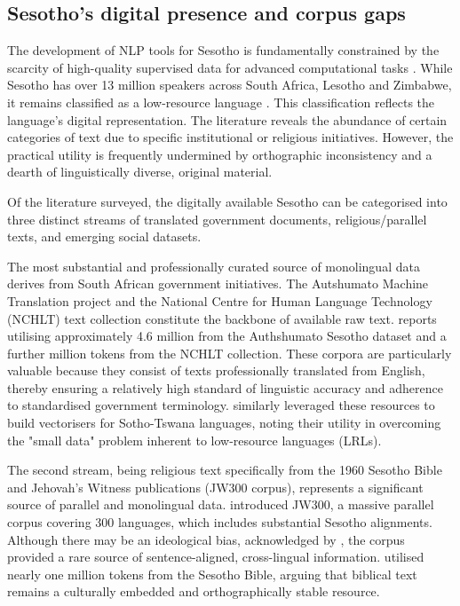 \documentclass[11pt,a4paper]{article}
\begin{document}
\subsection{Sesotho's digital presence and corpus gaps}
The development of NLP tools for Sesotho is fundamentally constrained by the scarcity of high-quality supervised data for advanced computational tasks \citep{sibeko2022overview}. While Sesotho has over 13 million speakers across South Africa, Lesotho and Zimbabwe, it remains classified as a low-resource language \citep{mokhosi2024sesotho}. This classification reflects the language's digital representation. The literature reveals the abundance of certain categories of text due to specific institutional or religious initiatives. However, the practical utility is frequently undermined by orthographic inconsistency and a dearth of linguistically diverse, original material.

Of the literature surveyed, the digitally available Sesotho can be categorised into three distinct streams of translated government documents, religious/parallel texts, and emerging social datasets.

The most substantial and professionally curated source of monolingual data derives from South African government initiatives. The Autshumato Machine Translation project and the National Centre for Human Language Technology (NCHLT) text collection constitute the backbone of available raw text. \citet{Sibeko2024} reports utilising approximately 4.6 million from the Authshumato Sesotho dataset and a further million tokens from the NCHLT collection. These corpora are particularly valuable because they consist of texts professionally translated from English, thereby ensuring a relatively high standard of linguistic accuracy and adherence to standardised government terminology. \citet{marivate2020investigating} similarly leveraged these resources to build vectorisers for Sotho-Tswana languages, noting their utility in overcoming the "small data" problem inherent to low-resource languages (LRLs).

The second stream, being religious text specifically from the 1960 Sesotho Bible and Jehovah's Witness publications (JW300 corpus), represents a significant source of parallel and monolingual data. \citet{agic2019jw300} introduced JW300, a massive parallel corpus covering 300 languages, which includes substantial Sesotho alignments. Although there may be an ideological bias, acknowledged by \citet{agic2019jw300}, the corpus provided a rare source of sentence-aligned, cross-lingual information. \citet{Sibeko2024} utilised nearly one million tokens from the Sesotho Bible, arguing that biblical text remains a culturally embedded and orthographically stable resource.
\end{document}

